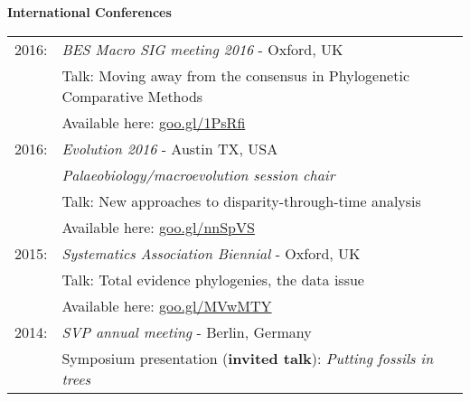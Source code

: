 \documentclass[10pt,a4paper]{article}
\begin{document}
{\bigskip

\raggedright\textbf{International Conferences}\\[1.5ex]
\begin{tabular}{ll}
2016: & \textit{BES Macro SIG meeting 2016} - Oxford, UK\\
& Talk: Moving away from the consensus in Phylogenetic Comparative Methods\\
& Available here: \href{https://figshare.com/articles/Guillerme_BESMacro2016_pdf/3478922}{goo.gl/1PsRfi}\\
2016: & \textit{Evolution 2016} - Austin TX, USA\\
& \textit{Palaeobiology/macroevolution session chair}\\
& Talk: New approaches to disparity-through-time analysis\\
& Available here: \href{https://figshare.com/articles/New_approaches_to_disparity-through-time_analysis/3437546}{goo.gl/nnSpVS}\\
2015: & \textit{Systematics Association Biennial} - Oxford, UK\\
& Talk: Total evidence phylogenies, the data issue\\ 
& Available here: \href{http://www.slideshare.net/ThomasGuillerme/total-evidence-phylogenies-the-missing-data-issue}{goo.gl/MVwMTY}\\
2014: & \textit{SVP annual meeting} - Berlin, Germany\\
& Symposium presentation (\textbf{invited talk}): \textit{Putting fossils in trees}\\

\end{tabular}}
\end{document}
